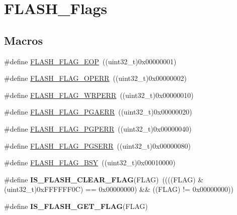 \hypertarget{group___f_l_a_s_h___flags}{}\section{F\+L\+A\+S\+H\+\_\+\+Flags}
\label{group___f_l_a_s_h___flags}
\subsection*{Macros}
\begin{DoxyCompactItemize}
\item 
\#define \hyperlink{group___f_l_a_s_h___flags_gaf043ba4d8f837350bfc7754a99fae5a9}{F\+L\+A\+S\+H\+\_\+\+F\+L\+A\+G\+\_\+\+E\+O\+P}~((uint32\+\_\+t)0x00000001)
\item 
\#define \hyperlink{group___f_l_a_s_h___flags_gad8a96ceda91fcf0d1299da933b5816f1}{F\+L\+A\+S\+H\+\_\+\+F\+L\+A\+G\+\_\+\+O\+P\+E\+R\+R}~((uint32\+\_\+t)0x00000002)
\item 
\#define \hyperlink{group___f_l_a_s_h___flags_ga6abf64f916992585899369166db3f266}{F\+L\+A\+S\+H\+\_\+\+F\+L\+A\+G\+\_\+\+W\+R\+P\+E\+R\+R}~((uint32\+\_\+t)0x00000010)
\item 
\#define \hyperlink{group___f_l_a_s_h___flags_ga2c3f4dbea065f8ea2987eada4dab30bd}{F\+L\+A\+S\+H\+\_\+\+F\+L\+A\+G\+\_\+\+P\+G\+A\+E\+R\+R}~((uint32\+\_\+t)0x00000020)
\item 
\#define \hyperlink{group___f_l_a_s_h___flags_ga88a93907641f5eeb4091a26b84c94897}{F\+L\+A\+S\+H\+\_\+\+F\+L\+A\+G\+\_\+\+P\+G\+P\+E\+R\+R}~((uint32\+\_\+t)0x00000040)
\item 
\#define \hyperlink{group___f_l_a_s_h___flags_ga25b80c716320e667162846da8be09b68}{F\+L\+A\+S\+H\+\_\+\+F\+L\+A\+G\+\_\+\+P\+G\+S\+E\+R\+R}~((uint32\+\_\+t)0x00000080)
\item 
\#define \hyperlink{group___f_l_a_s_h___flags_gad3bc368f954ad7744deda3315da2fff7}{F\+L\+A\+S\+H\+\_\+\+F\+L\+A\+G\+\_\+\+B\+S\+Y}~((uint32\+\_\+t)0x00010000)
\item 
\hypertarget{group___f_l_a_s_h___flags_ga82f8c6104c348d6aa47c7658ed3b6b36}{}\#define {\bfseries I\+S\+\_\+\+F\+L\+A\+S\+H\+\_\+\+C\+L\+E\+A\+R\+\_\+\+F\+L\+A\+G}(F\+L\+A\+G)~((((F\+L\+A\+G) \& (uint32\+\_\+t)0x\+F\+F\+F\+F\+F\+F0\+C) == 0x00000000) \&\& ((\+F\+L\+A\+G) != 0x00000000))\label{group___f_l_a_s_h___flags_ga82f8c6104c348d6aa47c7658ed3b6b36}

\item 
\#define {\bfseries I\+S\+\_\+\+F\+L\+A\+S\+H\+\_\+\+G\+E\+T\+\_\+\+F\+L\+A\+G}(F\+L\+A\+G)
\end{DoxyCompactItemize}


